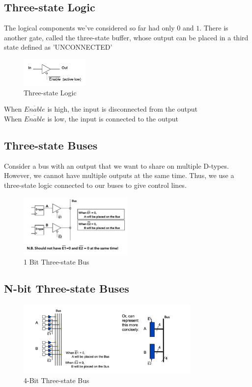 \documentclass[a4paper]{article}
\theoremstyle{plain}
\theoremstyle{definition}
\theoremstyle{remark}
\begin{document}
\subsection{Three-state Logic}
The logical components we've considered so far had only $0 $ and $ 1$. There is another gate, called the three-state buffer, whose output can be placed in a third state defined as 'UNCONNECTED'
\begin{figure}[H]
	\centering
	\includegraphics[width=0.3\textwidth]{figures/three.png}
	\caption{Three-state Logic}
	\label{fig:three-png}
\end{figure}
When $\overline{Enable}$ is high, the input is disconnected from the output \\
When $\overline{Enable}$ is low, the input is connected to the output
\subsection{Three-state Buses}
Consider a bus with an output that we want to share on multiple D-types. However, we cannot have multiple outputs at the same time. Thus, we use a three-state logic connected to our buses to give control lines. 
\begin{figure}[H]
	\centering
	\includegraphics[width=0.5\textwidth]{figures/bus.png}
	\caption{1 Bit Three-state Bus}
	\label{fig:figures-bus-png}
\end{figure}
\subsection{N-bit Three-state Buses}
\begin{figure}[H]
	\centering
	\includegraphics[width=0.8\textwidth]{figures/multibus.png}
	\caption{4-Bit Three-state Bus}
	\label{fig:figures-multibus-png}
\end{figure}
\end{document}
